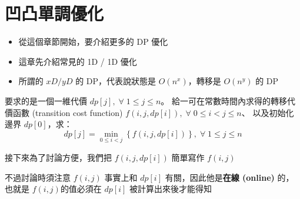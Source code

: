\documentclass[standalone]{beamer}
\begin{document}
\section{凹凸單調優化}

\begin{frame}{}
  \begin{itemize}
    \item 從這個章節開始，要介紹更多的 DP 優化
    \item 這章先介紹常見的 1D / 1D 優化
    \item 所謂的 $xD/yD$ 的 DP，代表說狀態是 $O(n^x)$，轉移是 $O(n^y)$ 的 DP
  \end{itemize}
\end{frame}

\begin{frame}{}
  \begin{theorem}[(1D/1D)]
  要求的是一個一維代價 $dp[j], \;\forall\; 1\leq j\leq n$。
  給一可在常數時間內求得的轉移代價函數 (transition cost function) $f(i,j,dp[i]), \;\forall\; 0\leq i<j\leq n$、
  以及初始化邊界 $dp[0]$，求：
  \[ dp[j] = \min_{0\leq i<j}\left\{f(i,j,dp[i])\right\}, \;\forall\; 1\leq j \leq n \]
  \end{theorem}
  接下來為了討論方便，我們把 $f(i,j,dp[i])$ 簡單寫作 $f(i,j)$

  不過討論時須注意 $f(i,j)$ 事實上和 $dp[i]$ 有關，因此他是\textbf{在線 (online)} 的，也就是 $f(i,j)$的值必須在 $dp[i]$ 被計算出來後才能得知
\end{frame}
\end{document}

